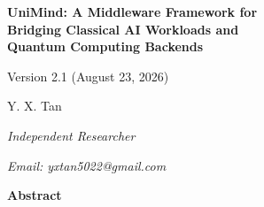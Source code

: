 ﻿\documentclass[12pt,a4paper]{article}
\begin{document}
\begin{titlepage}
\centering
\vspace*{2cm}

{\LARGE\bfseries UniMind: A Middleware Framework for\\[6pt]
Bridging Classical AI Workloads and\\[6pt]
Quantum Computing Backends\par}

\vspace{0.8cm}

{\normalsize\rmfamily Version 2.1 (August 23, 2026)\par}

\vspace{1.2cm}

{\Large Y. X. Tan\par}
\vspace{0.3cm}
{\normalsize\itshape Independent Researcher\par}
{\normalsize\itshape Email: yxtan5022@gmail.com\par}

\vspace{1.8cm}

{\large\bfseries Abstract\par}
\vspace{0.5cm}


\end{titlepage}
\end{document}
